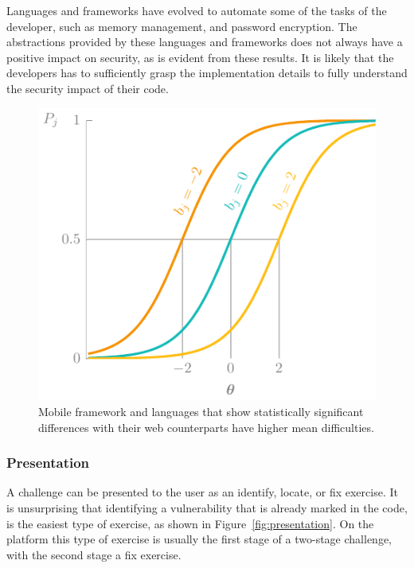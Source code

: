 Languages and frameworks have evolved to automate some of the tasks of the developer, such as memory management, and password encryption.
The abstractions provided by these languages and frameworks does not always have a positive impact on security, as is evident from these results.
It is likely that the developers has to sufficiently grasp the implementation details to fully understand the security impact of their code.

\begin{figure}
    \centering
    \includegraphics[page=11]{03-education/figures/tikzfigures.pdf}
    \caption[Mobile versus web frameworks]{Mobile framework and languages that show statistically significant differences with their web counterparts have higher mean difficulties.}
    \label{fig:frames3}
\end{figure}

\subsubsection{Presentation}
A challenge can be presented to the user as an identify, locate, or fix exercise.
It is unsurprising that identifying a vulnerability that is already marked in the code, is the easiest type of exercise, as shown in Figure~\ref{fig:presentation}. 
On the platform this type of exercise is usually the first stage of a two-stage challenge, with the second stage a fix exercise.

